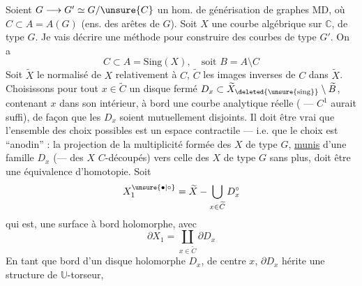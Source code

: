 
Soient $G\longrightarrow G'\simeq G/\unsure{C}$ un hom. de générisation de graphes MD, où $C\subset A=A(G)$ (ens. des arêtes  de $G$). Soit $X$ une courbe algébrique sur $\mathbb{C}$, de type $G$. Je vais décrire une méthode pour construire des courbes  de type $G'$. On a
\[
C\subset A=\mathrm{Sing}(X),\quad\text{soit }B=A\setminus C
\]
Soit  $\widetilde X$ le normalisé de $X$ relativement à $C$, $\widetilde C$  les images inverses de $C$  dans $\widetilde X$. Choisissons pour tout  $x\in\widetilde C$ un disque fermé $D_x\subset\widetilde X_{\deleted{\unsure{\mathrm{sing}}}}\setminus\widetilde B$, contenant $x$ dans son intérieur, à bord   une courbe analytique réelle ( --- $C^1$ aurait suffi), de façon que les $D_x$ soient mutuellement disjoints. Il doit être vrai que l'ensemble des choix possibles est  un espace contractile --- i.e. que le choix est ``anodin'' : la projection de la multiplicité  formée des $X$ de type $G$, \uline{munis} d'une famille $D_x$ (---  des $X$ $C$-découpés) vers celle des $X$ de type $G$ sans plus, doit être une équivalence d'homotopie. Soit
\[
X_1^{\unsure{\bullet|\circ}}=\widetilde X-\bigcup_{x\in\widetilde C}D_x^\circ
\]
qui est,  une surface à bord holomorphe, avec
\[
\partial X_1=\coprod_{x\in\widetilde C}\partial D_x
\]
En tant que bord d'un disque holomorphe $D_x$, de centre $x$, $\partial D_x$ hérite une structure de $\mathbb{U}$-torseur,

